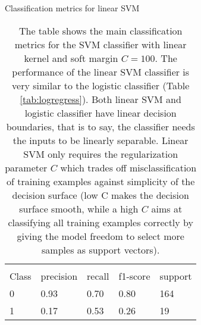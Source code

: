\documentclass[11pt]{article}
\theoremstyle{definition}
\theoremstyle{remark}
\begin{document}

\begin{table}[H]
\caption{Classification metrics for linear SVM}
\begin{center} 
\begin{tabular}{lllll}
\hline
\multicolumn{1}{c}{} \\
Class & precision & recall & f1-score & support     \\
\hline
0 & 0.93  &    0.70   &   0.80   &    164 \\
1 & 0.17  &    0.53   &   0.26   &    19 \\
\hline
\end{tabular}
\caption{The table shows the main classification metrics for the SVM classifier with linear kernel and soft margin $C=100$. The performance of the linear SVM classifier is very similar to the logistic classifier (Table \ref{tab:logregress}). 
Both linear SVM and logistic classifier have linear decision boundaries, that is to say, the classifier needs the inputs to be linearly separable. Linear SVM only requires the regularization parameter $C$ which trades off misclassification of training examples against simplicity of the decision surface (low C makes the decision surface smooth, while a high $C$ aims at classifying all training examples correctly by giving the model freedom to select more samples as support vectors).}  \label{tab:svm} 
\end{center}
\end{table}
\end{document}
